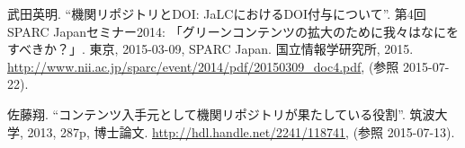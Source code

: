 \documentclass[a4paper,11pt,onecolumn]{jsarticle} %
\begin{document}
\begin{thebibliography}{99}

武田英明. ``機関リポジトリとDOI: JaLCにおけるDOI付与について''. 第4回SPARC Japanセミナー2014:  「グリーンコンテンツの拡大のために我々はなにをすべきか？」. 東京, 2015-03-09, SPARC Japan. 国立情報学研究所, 2015. \url{http://www.nii.ac.jp/sparc/event/2014/pdf/20150309_doc4.pdf}, (参照 2015-07-22).

佐藤翔. ``コンテンツ入手元として機関リポジトリが果たしている役割''. 筑波大学, 2013, 287p, 博士論文. \url{http://hdl.handle.net/2241/118741}, (参照 2015-07-13).

\end{thebibliography}
\end{document}
